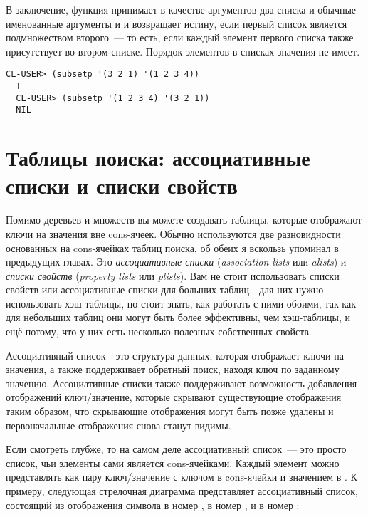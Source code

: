 В заключение, функция  принимает в качестве аргументов два списка и обычные
именованные аргументы  и  и возвращает истину, если первый список
является подмножеством второго~--- то есть, если каждый элемент первого списка также
присутствует во втором списке.  Порядок элементов в списках значения не имеет.

\begin{lstlisting}[style=lisprepl]
  CL-USER> (subsetp '(3 2 1) '(1 2 3 4))
  T
  CL-USER> (subsetp '(1 2 3 4) '(3 2 1))
  NIL
\end{lstlisting}


\section{Таблицы поиска: ассоциативные списки и списки свойств}

Помимо деревьев и множеств вы можете создавать таблицы, которые отображают ключи на
значения вне cons-ячеек. Обычно используются две разновидности основанных на cons-ячейках
таблиц поиска, об обеих я вскользь упоминал в предыдущих главах. Это \textit{ассоциативные
  списки} (\textit{association lists} или \textit{alists}) и \textit{списки свойств}
(\textit{property lists} или \textit{plists}). Вам не стоит использовать списки свойств
или ассоциативные списки для больших таблиц - для них нужно использовать хэш-таблицы, но
стоит знать, как работать с ними обоими, так как для небольших таблиц они могут быть более
эффективны, чем хэш-таблицы, и ещё потому, что у них есть несколько полезных собственных
свойств.
 
Ассоциативный список - это структура данных, которая отображает ключи на значения, а также
поддерживает обратный поиск, находя ключ по заданному значению. Ассоциативные списки также
поддерживают возможность добавления отображений ключ/значение, которые скрывают
существующие отображения таким образом, что скрывающие отображения могут быть позже
удалены и первоначальные отображения снова станут видимы.

Если смотреть глубже, то на самом деле ассоциативный список~--- это просто список, чьи
элементы сами является cons-ячейками. Каждый элемент можно представлять как пару
ключ/значение с ключом в  cons-ячейки и значением в . К примеру,
следующая стрелочная диаграмма представляет ассоциативный список, состоящий из отображения
символа  в номер ,  в номер , и  в номер :



